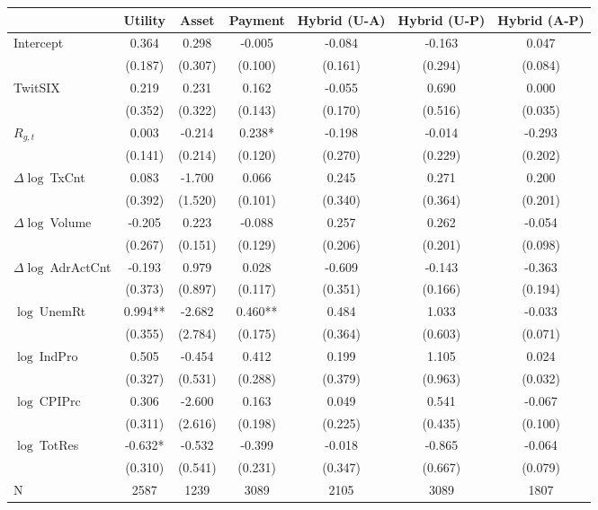 \begin{table}[ht]
\centering
\scriptsize
\setlength{\tabcolsep}{4pt}
\begin{tabular}{l *{6}{c}}
\toprule
 & Utility & Asset & Payment & Hybrid (U-A) & Hybrid (U-P) & Hybrid (A-P) \\
\midrule
Intercept & 0.364 & 0.298 & -0.005 & -0.084 & -0.163 & 0.047 \\
 & (0.187) & (0.307) & (0.100) & (0.161) & (0.294) & (0.084) \\
\addlinespace
TwitSIX & 0.219 & 0.231 & 0.162 & -0.055 & 0.690 & 0.000 \\
 & (0.352) & (0.322) & (0.143) & (0.170) & (0.516) & (0.035) \\
\addlinespace
$R_{g,t}$ & 0.003 & -0.214 & 0.238* & -0.198 & -0.014 & -0.293 \\
 & (0.141) & (0.214) & (0.120) & (0.270) & (0.229) & (0.202) \\
\addlinespace
$\Delta\log\ $TxCnt & 0.083 & -1.700 & 0.066 & 0.245 & 0.271 & 0.200 \\
 & (0.392) & (1.520) & (0.101) & (0.340) & (0.364) & (0.201) \\
\addlinespace
$\Delta\log\ $Volume & -0.205 & 0.223 & -0.088 & 0.257 & 0.262 & -0.054 \\
 & (0.267) & (0.151) & (0.129) & (0.206) & (0.201) & (0.098) \\
\addlinespace
$\Delta\log\ $AdrActCnt & -0.193 & 0.979 & 0.028 & -0.609 & -0.143 & -0.363 \\
 & (0.373) & (0.897) & (0.117) & (0.351) & (0.166) & (0.194) \\
\addlinespace
$\log\ $UnemRt & 0.994** & -2.682 & 0.460** & 0.484 & 1.033 & -0.033 \\
 & (0.355) & (2.784) & (0.175) & (0.364) & (0.603) & (0.071) \\
\addlinespace
$\log\ $IndPro & 0.505 & -0.454 & 0.412 & 0.199 & 1.105 & 0.024 \\
 & (0.327) & (0.531) & (0.288) & (0.379) & (0.963) & (0.032) \\
\addlinespace
$\log\ $CPIPrc & 0.306 & -2.600 & 0.163 & 0.049 & 0.541 & -0.067 \\
 & (0.311) & (2.616) & (0.198) & (0.225) & (0.435) & (0.100) \\
\addlinespace
$\log\ $TotRes & -0.632* & -0.532 & -0.399 & -0.018 & -0.865 & -0.064 \\
 & (0.310) & (0.541) & (0.231) & (0.347) & (0.667) & (0.079) \\
\addlinespace
\midrule
N & 2587 & 1239 & 3089 & 2105 & 3089 & 1807 \\

\end{tabular}
\end{table}
